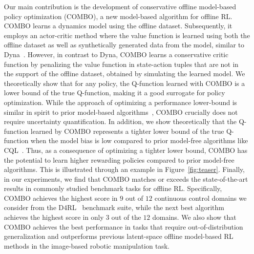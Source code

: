 Our main contribution is the development of conservative offline model-based policy optimization (COMBO), a new model-based algorithm for offline RL. COMBO
learns a dynamics model using the offline dataset. Subsequently, it employs an actor-critic
method where the value function is learned using both the offline dataset as well as synthetically generated data from the model, similar to Dyna~\cite{sutton1991dyna}. However, in contrast to Dyna, COMBO learns a conservative critic function
by penalizing the value function in state-action tuples that are not in the support of the offline dataset, obtained by simulating the learned model. 
%
We theoretically show that for any policy, the Q-function learned with COMBO is a lower bound of the true Q-function, making it a good surrogate for policy optimization.
While the approach of optimizing a performance lower-bound is similar in spirit to prior model-based algorithms~\cite{kidambi2020morel, yu2020mopo},
COMBO crucially does not require uncertainty quantification.
In addition, we show theoretically that the Q-function learned by COMBO represents a tighter lower bound of the true Q-function when the model bias is low compared to prior model-free algorithms like CQL~\cite{kumar2020conservative}.
Thus, as a consequence of optimizing a tighter lower bound, COMBO has the potential to learn higher rewarding policies compared to prior model-free algorithms. This is illustrated through an example in Figure~\ref{fig:teaser}.
Finally, in our experiments, we find that COMBO matches or exceeds the state-of-the-art results in commonly studied benchmark tasks for offline RL. Specifically, COMBO achieves the highest score in $9$ out of $12$ continuous control domains we consider from the D4RL~\cite{fu2020d4rl} benchmark suite, while the next best algorithm achieves the highest score in only $3$ out of the $12$ domains. We also show that COMBO achieves the best performance in tasks that require out-of-distribution generalization and outperforms previous latent-space offline model-based RL methods in the image-based robotic manipulation task.%
